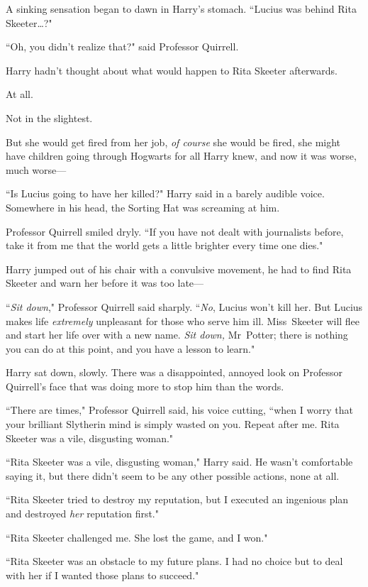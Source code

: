 A sinking sensation began to dawn in Harry's stomach. ``Lucius was behind Rita Skeeter{\ldots}?"

``Oh, you didn't realize that?" said Professor Quirrell.

Harry hadn't thought about what would happen to Rita Skeeter afterwards.

At all.

Not in the slightest.

But she would get fired from her job, \emph{of course} she would be fired, she might have children going through Hogwarts for all Harry knew, and now it was worse, much worse—

``Is Lucius going to have her killed?" Harry said in a barely audible voice. Somewhere in his head, the Sorting Hat was screaming at him.

Professor Quirrell smiled dryly. ``If you have not dealt with journalists before, take it from me that the world gets a little brighter every time one dies."

Harry jumped out of his chair with a convulsive movement, he had to find Rita Skeeter and warn her before it was too late—

``\emph{Sit down}," Professor Quirrell said sharply. ``\emph{No}, Lucius won't kill her. But Lucius makes life \emph{extremely} unpleasant for those who serve him ill. Miss~Skeeter will flee and start her life over with a new name. \emph{Sit down,} Mr~Potter; there is nothing you can do at this point, and you have a lesson to learn."

Harry sat down, slowly. There was a disappointed, annoyed look on Professor Quirrell's face that was doing more to stop him than the words.

``There are times," Professor Quirrell said, his voice cutting, ``when I worry that your brilliant Slytherin mind is simply wasted on you. Repeat after me. Rita Skeeter was a vile, disgusting woman."

``Rita Skeeter was a vile, disgusting woman," Harry said. He wasn't comfortable saying it, but there didn't seem to be any other possible actions, none at all.

``Rita Skeeter tried to destroy my reputation, but I executed an ingenious plan and destroyed \emph{her} reputation first."

``Rita Skeeter challenged me. She lost the game, and I won."

``Rita Skeeter was an obstacle to my future plans. I had no choice but to deal with her if I wanted those plans to succeed."

